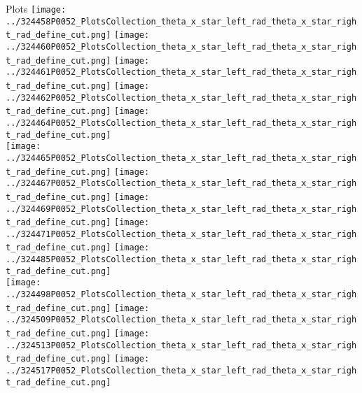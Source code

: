 \documentclass{beamer}
\begin{document}
\begin{frame}\tiny
        \begin{block}{Plots}
		  \centering
                \texttt{[image: ../324458P0052\_PlotsCollection\_theta\_x\_star\_left\_rad\_theta\_x\_star\_right\_rad\_define\_cut.png]}
                \texttt{[image: ../324460P0052\_PlotsCollection\_theta\_x\_star\_left\_rad\_theta\_x\_star\_right\_rad\_define\_cut.png]}
                \texttt{[image: ../324461P0052\_PlotsCollection\_theta\_x\_star\_left\_rad\_theta\_x\_star\_right\_rad\_define\_cut.png]}
                \texttt{[image: ../324462P0052\_PlotsCollection\_theta\_x\_star\_left\_rad\_theta\_x\_star\_right\_rad\_define\_cut.png]}
                \texttt{[image: ../324464P0052\_PlotsCollection\_theta\_x\_star\_left\_rad\_theta\_x\_star\_right\_rad\_define\_cut.png]}\\
                \texttt{[image: ../324465P0052\_PlotsCollection\_theta\_x\_star\_left\_rad\_theta\_x\_star\_right\_rad\_define\_cut.png]}
                \texttt{[image: ../324467P0052\_PlotsCollection\_theta\_x\_star\_left\_rad\_theta\_x\_star\_right\_rad\_define\_cut.png]}
                \texttt{[image: ../324469P0052\_PlotsCollection\_theta\_x\_star\_left\_rad\_theta\_x\_star\_right\_rad\_define\_cut.png]}
                \texttt{[image: ../324471P0052\_PlotsCollection\_theta\_x\_star\_left\_rad\_theta\_x\_star\_right\_rad\_define\_cut.png]}
                \texttt{[image: ../324485P0052\_PlotsCollection\_theta\_x\_star\_left\_rad\_theta\_x\_star\_right\_rad\_define\_cut.png]}\\
                \texttt{[image: ../324498P0052\_PlotsCollection\_theta\_x\_star\_left\_rad\_theta\_x\_star\_right\_rad\_define\_cut.png]}
                \texttt{[image: ../324509P0052\_PlotsCollection\_theta\_x\_star\_left\_rad\_theta\_x\_star\_right\_rad\_define\_cut.png]}
                \texttt{[image: ../324513P0052\_PlotsCollection\_theta\_x\_star\_left\_rad\_theta\_x\_star\_right\_rad\_define\_cut.png]}
                \texttt{[image: ../324517P0052\_PlotsCollection\_theta\_x\_star\_left\_rad\_theta\_x\_star\_right\_rad\_define\_cut.png]}

\end{block}
\end{frame}
\end{document}
